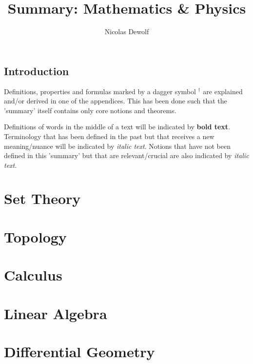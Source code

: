 \documentclass[12pt]{report}
\begin{document}
\reversemarginpar
\setcounter{tocdepth}{2}

\title{Summary: Mathematics \& Physics}
\author{Nicolas Dewolf}
\maketitle

\tableofcontents

\chapter{Introduction}
Definitions, properties and formulas marked by a dagger symbol $^\dag$ are explained and/or derived in one of the appendices. This has been done such that the 'summary' itself contains only core notions and theorems.

Definitions of words in the middle of a text will be indicated by \textbf{bold text}. Terminology that has been defined in the past but that receives a new meaning/nuance will be indicated by \textit{italic text}. Notions that have not been defined in this 'summary' but that are relevant/crucial are also indicated by \textit{italic text}.

\part{Set Theory}


\part{Topology}



\part{Calculus}





%
%
%

\part{Linear Algebra}







\part{Differential Geometry}








\end{document}
